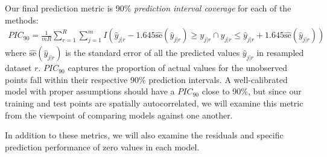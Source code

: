 \documentclass{article}
\begin{document}
Our final prediction metric is 90\% \textit{prediction interval coverage} for each of the methods:
\begin{align*}
PIC_{90} = \frac{1}{mR} \sum_{r=1}^R \sum_{j=1}^m I\left(\hat{y}_{j|r} - 1.645\hat{\text{se}}(\hat{y}_{j|r}) \geq y_{j|r} \cap y_{j|r} \leq \hat{y}_{j|r} + 1.645\hat{\text{se}}(\hat{y}_{j|r})\right)
\end{align*}
where $\hat{\text{se}}(\hat{y}_{j|r})$ is the standard error of all the predicted values $\hat{y}_{j|r}$ in resampled dataset $r$.\cite{verhoef13}
$PIC_{90}$ captures the proportion of actual values for the unobserved points fall within their respective 90\% prediction intervals.
A well-calibrated model with proper assumptions should have a $PIC_{90}$ close to 90\%, but since our training and test points are spatially autocorrelated, we will examine this metric from the viewpoint of comparing models against one another. 

In addition to these metrics, we will also examine the residuals and specific prediction performance of zero values in each model.
\end{document}

